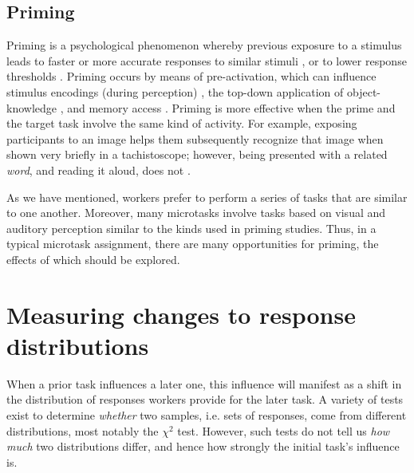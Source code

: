 \documentclass{sigchi}
\begin{document}
\subsection{Priming}
Priming is a psychological phenomenon whereby previous exposure to a 
stimulus leads to faster or more accurate responses to similar stimuli 
\cite{Ghuman17062008},
or to lower response thresholds \cite{BJOP1826}.  
Priming occurs by means of pre-activation, which can influence
stimulus encodings (during perception) \cite{BJOP1826}, 
the top-down application of object-knowledge \cite{Ghuman17062008},
and memory access \cite{beller1971priming}.
Priming is more 
effective when the prime and the target task involve the same kind of 
activity.  For example, exposing participants to an image helps them 
subsequently recognize that image when shown very briefly in a 
tachistoscope; however, being presented with a related \textit{word}, 
and reading it aloud, does not \cite{BJOP1796}.

As we have mentioned, workers prefer to perform a series of tasks that
are similar to one another.
Moreover, many 
microtasks involve tasks based on visual and auditory perception 
similar to the kinds used in priming studies.
Thus, in a typical microtask assignment, there are many opportunities for 
priming, the effects of which should be explored.

\section{Measuring changes to response distributions}
When a prior task influences a later one, this influence will manifest as
a shift in the distribution of responses workers provide for the later 
task.
A variety of tests exist to determine \textit{whether} two samples, 
i.e. sets of responses, come from different distributions, 
most notably the $\chi^2$ test.  
However, such tests
do not tell us \textit{how much} two distributions differ, and hence
how strongly the initial task's influence is.
\end{document}
